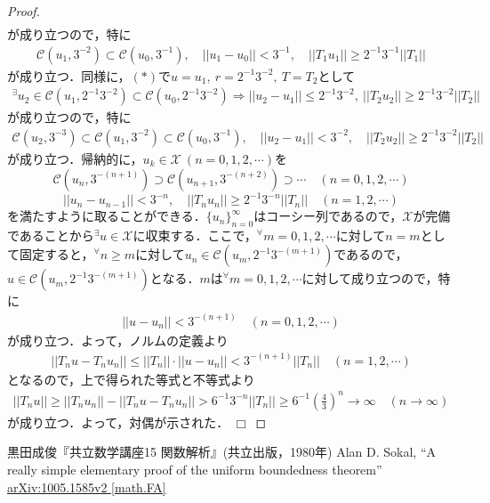 \documentclass[dvipdfmx]{jsarticle}
\newtheorem{proof}{証明}
\def\qed{\hfill $\Box$}
\begin{document}
\begin{proof}
\begin{align*}
\end{align*}
が成り立つので，特に
\begin{align*}
\mathcal{C}(u_1,3^{-2})\subset\mathcal{C}(u_0,3^{-1}),\quad ||u_1-u_0||<3^{-1},\quad ||T_1 u_1||\geq 2^{-1}3^{-1}||T_1||
\end{align*}
が成り立つ．同様に，$(\ast)$で$u=u_1,{\ }r=2^{-1}3^{-2},{\ }T=T_2$として
\begin{align*}
^\exists u_2\in\mathcal{C}(u_1,2^{-1}3^{-2})\subset \mathcal{C}(u_0,2^{-1}3^{-2}) \Longrightarrow ||u_2-u_1||\leq 2^{-1}3^{-2},{\ }||T_2 u_2||\geq 2^{-1}3^{-2}||T_2||
\end{align*}
が成り立つので，特に
\begin{align*}
\mathcal{C}(u_2,3^{-3})\subset\mathcal{C}(u_1,3^{-2})\subset\mathcal{C}(u_0,3^{-1}),\quad ||u_2-u_1||<3^{-2},\quad ||T_2 u_2||\geq 2^{-1}3^{-2}||T_2||
\end{align*}
が成り立つ．帰納的に，$u_k\in\mathcal{X}{\ }(n=0,1,2,\cdots)$を
\begin{equation*}
\mathcal{C}(u_n,3^{-(n+1)})\supset\mathcal{C}(u_{n+1},3^{-(n+2)})\supset\cdots \quad (n=0,1,2,\cdots)
\end{equation*}
\begin{equation*}
||u_n-u_{n-1}||<3^{-n},\quad ||T_n u_n||\geq 2^{-1}3^{-n}||T_n|| \quad (n=1,2,\cdots)
\end{equation*}
を満たすように取ることができる．$\{u_n\}_{n=0}^{\infty}$はコーシー列であるので，$\mathcal{X}$が完備であることから$^\exists u\in\mathcal{X}$に収束する．ここで，$^\forall m=0,1,2,\cdots$に対して$n=m$として固定すると，$^\forall n\geq m$に対して$u_n\in \mathcal{C}(u_m,2^{-1}3^{-(m+1)})$であるので，$u\in \mathcal{C}(u_m,2^{-1}3^{-(m+1)})$となる．$m$は$^\forall m=0,1,2,\cdots$に対して成り立つので，特に
\begin{align*}
||u-u_n||<3^{-(n+1)} \quad (n=0,1,2,\cdots)
\end{align*}
が成り立つ．よって，ノルムの定義より
\begin{align*}
||T_n u-T_n u_n||\leq ||T_n||\cdot||u-u_n||<3^{-(n+1)}||T_n|| \quad (n=1,2,\cdots)
\end{align*}
となるので，上で得られた等式と不等式より
\begin{align*}
||T_n u||\geq ||T_n u_n||-||T_n u-T_n u_n||>6^{-1}3^{-n}||T_n||\geq 6^{-1}\left(\frac{4}{3}\right)^n\to\infty \quad (n\to\infty)
\end{align*}
が成り立つ．よって，対偶が示された．
\qed
\end{proof}
%
%
%
\begin{thebibliography}{99}
  黒田成俊『共立数学講座15 関数解析』(共立出版，1980年)
  Alan D. Sokal, “A really simple elementary proof of the uniform boundedness theorem”
  \href{https://arxiv.org/abs/1005.1585}{arXiv:1005.1585v2 [math.FA]}
\end{thebibliography}
%
%
%
%
\end{document}
